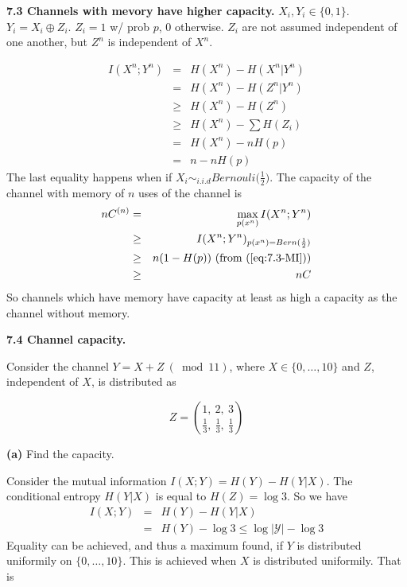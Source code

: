 \documentclass[10pt]{article}
\newcommand{\setbrace}[1]{{\{#1\}}}
\begin{document}
\begin{tiny}
\begin{multicols}{3}
\textbf{\scriptsize 7.3 Channels with mevory have higher capacity.}
    $X_i, Y_i \in \{0,1\}$.
    $Y_i = X_i \oplus Z_i$.
    $Z_i = 1$ w/ prob $p$, 0 otherwise.
    $Z_i$ are not assumed independent of one another, but $Z^n$ is independent of $X^n$.

\begin{eqnarray}
    I(X^n;Y^n) &=& H(X^n) - H(X^n|Y^n) \nonumber \\
    &=& H(X^n) - H(Z^n|Y^n) \nonumber\\
    &\ge& H(X^n) - H(Z^n) \nonumber\\
    &\ge& H(X^n) - \sum H(Z_i) \nonumber\\
    &=& H(X^n) - nH(p) \nonumber\\
    &=& n - nH(p) \label{eq:7.3-MI}
\end{eqnarray}
The last equality happens when if $X_i \sim_{i.i.d} Bernouli\big(\frac{1}{2}\big)$.
The capacity of the channel with memory of $n$ uses of the channel is
\begin{eqnarray*}
    nC^{(n)} &=& \max_{p(x^n)} I(X^n; Y^n) \\
    &\ge& I(X^n;Y^n)_{p(x^n)=Bern(\frac{1}{2})} \\
    &\ge& n ( 1 - H(p)) \text{ (from (\ref{eq:7.3-MI}))} \\
    &\ge& nC
\end{eqnarray*}
So channels which have memory have capacity at least as high a capacity as the channel without memory.

\textbf{\scriptsize 7.4 Channel capacity.}

Consider the channel $Y=X+Z\ (\bmod 11)$, where $X \in \setbrace{0,\dots,10}$ and $Z$, independent of $X$, is distributed as

\begin{equation*}
    Z = {{1,\ 2,\ 3}\choose{\frac{1}{3},\ \frac{1}{3},\ \frac{1}{3}}}
\end{equation*}


\textbf{(a)} Find the capacity.

Consider the mutual information $I(X;Y) = H(Y) - H(Y|X)$. The conditional
entropy $H(Y|X)$ is equal to $H(Z)=\log 3$.
So we have
\begin{eqnarray*}
    I(X;Y) &=& H(Y) - H(Y|X)  \\
    &=& H(Y) - \log 3 
    \leq \log {\vert \mathcal{Y} \vert} - \log 3 \label{eq:7.4-cap}
\end{eqnarray*}
Equality can be achieved, and thus a maximum found, if $Y$ is distributed
uniformily on $\setbrace{0,\dots,10}$. This is achieved when $X$ is
distributed uniformily. That is



\end{multicols}
\end{tiny}
\end{document}
